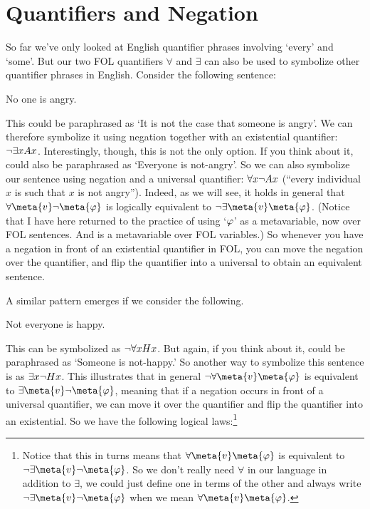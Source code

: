 \section{Quantifiers and Negation}




So far we've only looked at English quantifier phrases involving `every' and `some'.  But our two FOL quantifiers $\forall$ and $\exists$ can also be used to symbolize other quantifier phrases in English.  Consider the following sentence:
	\begin{earg}
		\item[\ex{q.neg1}] No one is angry.
	\end{earg}
This could be paraphrased as `It is not the case that someone is angry'.  We can therefore symbolize it using negation together with an existential quantifier: $\neg \exists x Ax$.  Interestingly, though, this is not the only option.  If you think about it,  could also be paraphrased as `Everyone is not-angry'. So we can also symbolize our sentence  using negation and a universal quantifier: $\forall x \neg Ax$ (``every individual $x$ is such that $x$ is not angry''). Indeed, as we will see, it holds in general that $\forall \meta{v} \enot\meta{\varphi}$ is logically equivalent to $\enot\exists \meta{v}\meta{\varphi}$. (Notice that I have here returned to the practice of using `$\mathcal{\varphi}$' as a metavariable, now over FOL sentences.  And  is a metavariable over FOL variables.)   So whenever you have a negation in front of an existential quantifier in FOL, you can move the negation over the quantifier, and flip the quantifier into a universal to obtain an equivalent sentence.

A similar pattern emerges if we consider the following.
	\begin{earg}
		\item[\ex{q.neg2}] Not everyone is happy.
	\end{earg}
This can be symbolized as $\neg \forall x Hx$.  But again, if you think about it,  could be paraphrased as `Someone is not-happy.'  So another way to symbolize this sentence is as $\exists x\neg Hx$.  This illustrates that in general $\enot \forall \meta{v} \meta{\varphi}$ is equivalent to $\exists \meta{v} \enot \meta{\varphi}$, meaning that if a negation occurs in front of a universal quantifier, we can move it over the quantifier and flip the quantifier into an existential.  So we have the following logical laws:\footnote{Notice that this in turns means that $\forall \meta{v} \meta{\varphi}$ is equivalent to $\enot \exists\meta{v}  \enot  \meta{\varphi}$.  So we don't really need $\forall$ in our language in addition to $\exists$, we could just define one in terms of the other and always write $\enot \exists \meta{v} \enot  \meta{\varphi}$ when we mean $\forall \meta{v} \meta{\varphi}$.}

